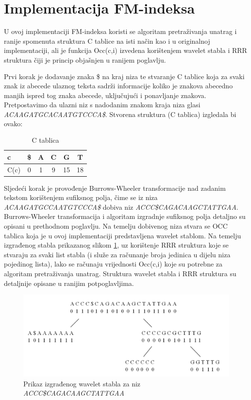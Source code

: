 \section{Implementacija FM-indeksa}
U ovoj implementaciji FM-indeksa koristi se algoritam pretraživanja unatrag i ranije spomenuta struktura C tablice na isti način kao i u originalnoj implementaciji, ali je funkcija Occ(c,i) izvedena korištenjem wavelet stabla i RRR struktura čiji je princip objašnjen u ranijem poglavlju.

Prvi korak je dodavanje znaka \$ na kraj niza te stvaranje C tablice koja za svaki znak iz abecede ulaznog teksta sadrži informacije koliko je znakova abecedno manjih ispred tog znaka abecede, uključujući i ponavljanje znakova. Pretpostavimo da ulazni niz s nadodanim znakom kraja niza glasi \emph{ACAAGATGCACAATGTCCCA\$}. Stvorena struktura (C tablica) izgledala bi ovako:

\begin{table}[htb]
\caption{C tablica}
\label{tbl:ctabl}
\centering
\begin{tabular}{|l||ccccc|} \hline
c & \$ & A & C & G & T \\ \hline
C(c) & 0 & 1 & 9 & 15 & 18 \\ \hline
\end{tabular}
\end{table}

\vspace{5 mm}
Sljedeći korak je provođenje Burrows-Wheeler transformacije nad zadanim tekstom  \linebreak korištenjem sufiksnog polja, čime se iz niza \emph{ACAAGATGCCAATGTCCCA\$} dobiva niz \emph{ACCC\$CAGACAAGCTATTGAA}. Burrows-Wheeler transformacija i algoritam izgradnje sufiksnog polja detaljno su opisani u prethodnom poglavlju.
Na temelju dobivenog niza stvara se OCC tablica koja je u ovoj implementaciji predstavljena wavelet stablom. Na temelju izgrađenog stabla prikazanog slikom  \ref{fmWaveletTree}, uz korištenje RRR struktura koje se stvaraju za svaki list stabla (i služe za računanje broja jedinica u dijelu niza pojedinog lista), lako se računaju  vrijednosti Occ(c,i) koje su potrebne za algoritam pretraživanja unatrag. Struktura wavelet stabla i RRR struktura su detaljnije opisane u ranijim potpoglavljima. 



\begin{figure}[H]
\centering
\includegraphics[width=\linewidth]{./pictures/fmStablo.png}
\caption{Prikaz izgrađenog wavelet stabla za niz \emph{ACCC\$CAGACAAGCTATTGAA}}\label{fmWaveletTree}
\end{figure}

